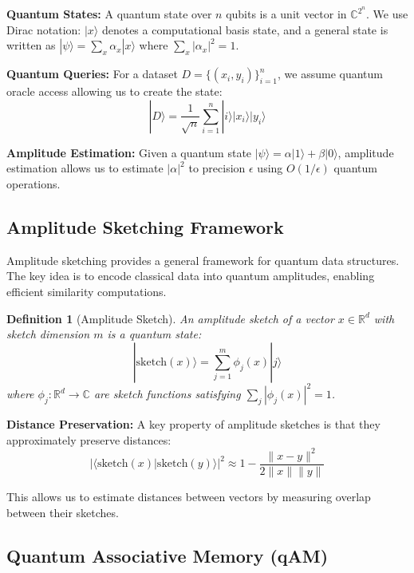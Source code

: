 \documentclass[11pt]{article}
\newtheorem{definition}{Definition}
\begin{document}
\textbf{Quantum States:} A quantum state over $n$ qubits is a unit vector in $\mathbb{C}^{2^n}$. We use Dirac notation: $|x\rangle$ denotes a computational basis state, and a general state is written as $|\psi\rangle = \sum_x \alpha_x |x\rangle$ where $\sum_x |\alpha_x|^2 = 1$.

\textbf{Quantum Queries:} For a dataset $D = \{(x_i, y_i)\}_{i=1}^n$, we assume quantum oracle access allowing us to create the state:
\begin{equation}
|D\rangle = \frac{1}{\sqrt{n}} \sum_{i=1}^n |i\rangle |x_i\rangle |y_i\rangle
\end{equation}

\textbf{Amplitude Estimation:} Given a quantum state $|\psi\rangle = \alpha|1\rangle + \beta|0\rangle$, amplitude estimation \cite{brassard2002quantum} allows us to estimate $|\alpha|^2$ to precision $\epsilon$ using $O(1/\epsilon)$ quantum operations.

\subsection{Amplitude Sketching Framework}

Amplitude sketching \cite{giovannetti2008quantum} provides a general framework for quantum data structures. The key idea is to encode classical data into quantum amplitudes, enabling efficient similarity computations.

\begin{definition}[Amplitude Sketch]
An amplitude sketch of a vector $x \in \mathbb{R}^d$ with sketch dimension $m$ is a quantum state:
\begin{equation}
|\text{sketch}(x)\rangle = \sum_{j=1}^m \phi_j(x) |j\rangle
\end{equation}
where $\phi_j: \mathbb{R}^d \to \mathbb{C}$ are sketch functions satisfying $\sum_j |\phi_j(x)|^2 = 1$.
\end{definition}

\textbf{Distance Preservation:} A key property of amplitude sketches is that they approximately preserve distances:
\begin{equation}
|\langle \text{sketch}(x) | \text{sketch}(y) \rangle|^2 \approx 1 - \frac{\|x-y\|^2}{2\|x\|\|y\|}
\end{equation}

This allows us to estimate distances between vectors by measuring overlap between their sketches.

\subsection{Quantum Associative Memory (qAM)}
\end{document}
